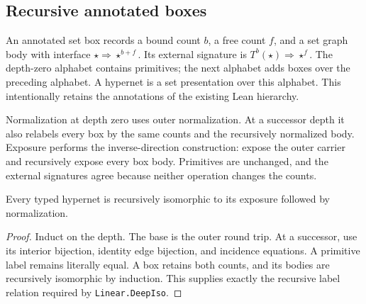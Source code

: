 



\subsection{Recursive annotated boxes}
\begin{definition}
An annotated set box records a bound count $b$, a free count $f$, and a set
graph body with interface $\star\Rightarrow\star^{b+f}$.
Its external signature is $T^b(\star)\Rightarrow\star^f$.
The depth-zero alphabet contains primitives; the next alphabet adds boxes over
the preceding alphabet. A hypernet is a set presentation over this alphabet.
This intentionally retains the annotations of the existing Lean hierarchy.
\end{definition}




\begin{definition}
Normalization at depth zero uses outer normalization. At a successor depth it
also relabels every box by the same counts and the recursively normalized body.
Exposure performs the inverse-direction construction: expose the outer carrier
and recursively expose every box body. Primitives are unchanged, and the
external signatures agree because neither operation changes the counts.
\end{definition}


\begin{theorem}
Every typed hypernet is recursively isomorphic to its exposure followed by
normalization.
\end{theorem}
\begin{proof}
Induct on the depth. The base is the outer round trip. At a successor, use its
interior bijection, identity edge bijection, and incidence equations. A primitive
label remains literally equal. A box retains both counts, and its bodies are
recursively isomorphic by induction. This supplies exactly the recursive
label relation required by \texttt{Linear.DeepIso}.
\end{proof}

